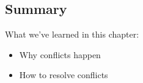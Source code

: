 \subsection{Summary}
\begin{frame}[fragile]
\subslidetitle
  What we've learned in this chapter:
  \begin{itemize}
    \item Why conflicts happen
    \item How to resolve conflicts
  \end{itemize}
\end{frame}
